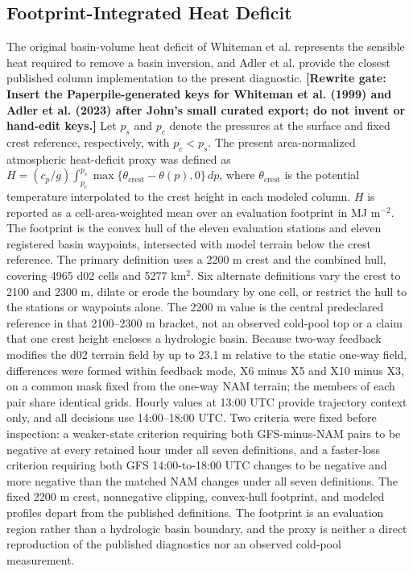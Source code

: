 \documentclass[air,article,submit,moreauthors]{Definitions/mdpi}
\newcommand{\rewritegate}[1]{\textbf{[Rewrite gate: #1]}}
\begin{document}
\subsection{Footprint-Integrated Heat Deficit}
\label{sec:v3-heatdeficit-methods}

The original basin-volume heat deficit of Whiteman et al. represents the sensible heat required to remove a basin inversion, and Adler et al. provide the closest published column implementation to the present diagnostic.
\rewritegate{Insert the Paperpile-generated keys for Whiteman et al. (1999) and Adler et al. (2023) after John's small curated export; do not invent or hand-edit keys.}
Let $p_{s}$ and $p_{c}$ denote the pressures at the surface and fixed crest reference, respectively, with $p_{c}<p_{s}$.
The present area-normalized atmospheric heat-deficit proxy was defined as $H=(c_{p}/g)\int_{p_{c}}^{p_{s}}\max\{\theta_{\mathrm{crest}}-\theta(p),0\}\,dp$, where $\theta_{\mathrm{crest}}$ is the potential temperature interpolated to the crest height in each modeled column.
$H$ is reported as a cell-area-weighted mean over an evaluation footprint in MJ m$^{-2}$.
The footprint is the convex hull of the eleven evaluation stations and eleven registered basin waypoints, intersected with model terrain below the crest reference.
The primary definition uses a 2200 m crest and the combined hull, covering 4965 d02 cells and 5277 km$^{2}$.
Six alternate definitions vary the crest to 2100 and 2300 m, dilate or erode the boundary by one cell, or restrict the hull to the stations or waypoints alone.
The 2200 m value is the central predeclared reference in that 2100--2300 m bracket, not an observed cold-pool top or a claim that one crest height encloses a hydrologic basin.
Because two-way feedback modifies the d02 terrain field by up to 23.1 m relative to the static one-way field, differences were formed within feedback mode, X6 minus X5 and X10 minus X3, on a common mask fixed from the one-way NAM terrain; the members of each pair share identical grids.
Hourly values at 13:00 UTC provide trajectory context only, and all decisions use 14:00--18:00 UTC.
Two criteria were fixed before inspection: a weaker-state criterion requiring both GFS-minus-NAM pairs to be negative at every retained hour under all seven definitions, and a faster-loss criterion requiring both GFS 14:00-to-18:00 UTC changes to be negative and more negative than the matched NAM changes under all seven definitions.
The fixed 2200 m crest, nonnegative clipping, convex-hull footprint, and modeled profiles depart from the published definitions.
The footprint is an evaluation region rather than a hydrologic basin boundary, and the proxy is neither a direct reproduction of the published diagnostics nor an observed cold-pool measurement.
\end{document}
